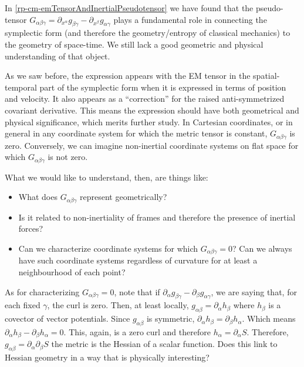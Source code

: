 {In \ref{rp-cm-emTensorAndInertialPseudotensor} we have found that the pseudo-tensor $G_{\alpha\beta\gamma} = \partial_{x^\alpha} g_{\beta \gamma} - \partial_{x^\beta} g_{\alpha \gamma}$ plays a fundamental role in connecting the symplectic form (and therefore the geometry/entropy of classical mechanics) to the geometry of space-time. We still lack a good geometric and physical understanding of that object.}

As we saw before, the expression appears with the EM tensor in the spatial-temporal part of the symplectic form when it is expressed in terms of position and velocity. It also appears as a “correction” for the raised anti-symmetrized covariant derivative. This means the expression should have both geometrical and physical significance, which merits further study. In Cartesian coordinates, or in general in any coordinate system for which the metric tensor is constant, $G_{\alpha\beta\gamma}$ is zero. Conversely, we can imagine non-inertial coordinate systems on flat space for which $G_{\alpha\beta\gamma}$ is not zero.

What we would like to understand, then, are things like:
\begin{itemize}
	\item What does $G_{\alpha\beta\gamma}$ represent geometrically?
	\item Is it related to non-inertiality of frames and therefore the presence of inertial forces?
	\item Can we characterize coordinate systems for which $G_{\alpha\beta\gamma}=0$? Can we always have such coordinate systems regardless of curvature for at least a neighbourhood of each point?
\end{itemize}

As for characterizing $G_{\alpha\beta\gamma}=0$, note that if $\partial_{\alpha} g_{\beta \gamma} - \partial_{\beta} g_{\alpha \gamma}$, we are saying that, for each fixed $\gamma$, the curl is zero. Then, at least locally, $g_{\alpha \beta} = \partial_\alpha h_\beta$ where $h_\beta$ is a covector of vector potentials. Since $g_{\alpha \beta}$ is symmetric, $\partial_\alpha h_\beta = \partial_\beta h_\alpha$. Which means $\partial_\alpha h_\beta - \partial_\beta h_\alpha = 0$. This, again, is a zero curl and therefore $h_\alpha = \partial_\alpha S$. Therefore, $g_{\alpha\beta} = \partial_\alpha \partial_\beta S$ the metric is the Hessian of a scalar function. Does this link to Hessian geometry in a way that is physically interesting?

